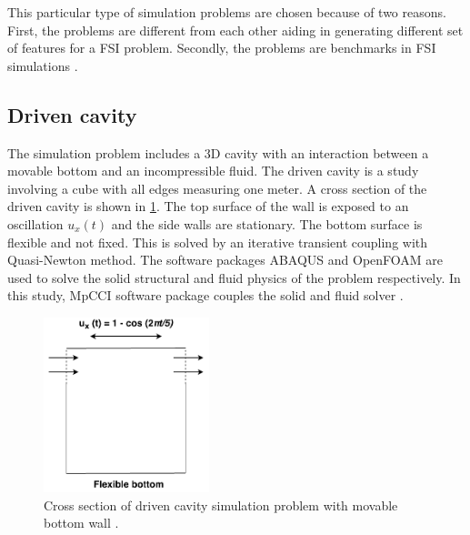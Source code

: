 This particular type of simulation problems are chosen because of two reasons. First, the problems are different from each other aiding in generating different set of features for a FSI problem. Secondly, the problems are benchmarks in FSI simulations \cite{2dbenchmark}.

\subsection{Driven cavity}
\label{section:driven_cavity}
The simulation problem includes a 3D cavity with an interaction between a movable bottom and an incompressible fluid. The driven cavity is a study involving a cube with all edges measuring one meter. A cross section of the driven cavity is shown in \ref{Fig:drivencavity_geometry}. The top surface of the wall is exposed to an oscillation $u_x(t)$ and the side walls are stationary. The bottom surface is flexible and not fixed. This is solved by an iterative transient coupling with Quasi-Newton method. The software packages ABAQUS and OpenFOAM are used to solve the solid structural and fluid physics of the problem respectively. In this study, MpCCI software package couples the solid and fluid solver \cite{MpCCI_documentation} \cite{driven_cavity}. 
    
    
\begin{figure}[!ht]
\centering
\includegraphics[width=0.43\textwidth,height=0.35\textheight]{images/driven_cavity_geometry.pdf}
\captionsetup{justification=justified}
\caption[2D cross section of driven cavity simulation problem]{Cross section of driven cavity simulation problem with movable bottom wall \cite{driven_cavity}.}
\label{Fig:drivencavity_geometry}
\end{figure}


